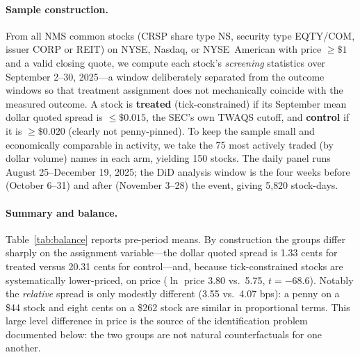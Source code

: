 \documentclass[12pt]{article}
\begin{document}
\paragraph{Sample construction.} From all NMS common stocks (CRSP share type NS, security
type EQTY/COM, issuer CORP or REIT) on NYSE, Nasdaq, or NYSE~American with price $\ge\$1$
and a valid closing quote, we compute each stock's \emph{screening} statistics over
September 2--30, 2025---a window deliberately separated from the outcome windows so that
treatment assignment does not mechanically coincide with the measured outcome. A stock is
\textbf{treated} (tick-constrained) if its September mean dollar quoted spread is
$\le\$0.015$, the SEC's own TWAQS cutoff, and \textbf{control} if it is $\ge\$0.020$
(clearly not penny-pinned). To keep the sample small and economically comparable in
activity, we take the 75 most actively traded (by dollar volume) names in each arm,
yielding 150 stocks. The daily panel runs August 25--December 19, 2025; the DiD analysis
window is the four weeks before (October 6--31) and after (November 3--28) the event, giving
5{,}820 stock-days.

\paragraph{Summary and balance.} Table~\ref{tab:balance} reports pre-period means. By
construction the groups differ sharply on the assignment variable---the dollar quoted spread
is 1.33 cents for treated versus 20.31 cents for control---and, because tick-constrained
stocks are systematically lower-priced, on price ($\ln$ price 3.80 vs.\ 5.75, $t=-68.6$).
Notably the \emph{relative} spread is only modestly different (3.55 vs.\ 4.07 bps): a
penny on a \$44 stock and eight cents on a \$262 stock are similar in proportional terms.
This large level difference in price is the source of the identification problem documented
below: the two groups are not natural counterfactuals for one another.
\end{document}
